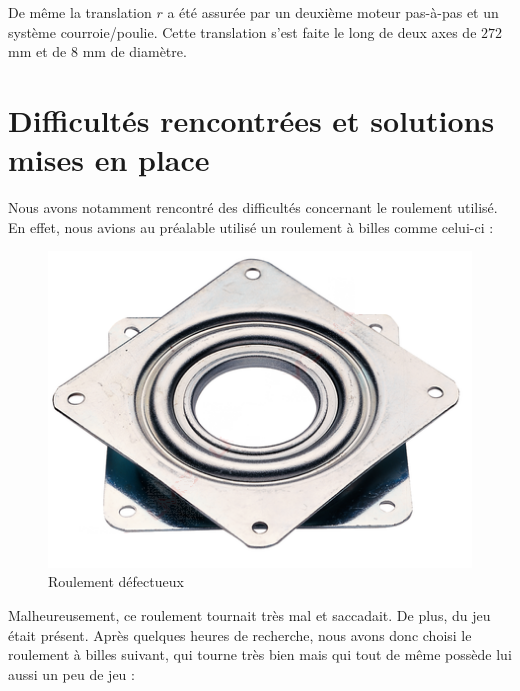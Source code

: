 \documentclass[12pt,a4paper]{report}
\begin{document}
De même la translation $r$ a été assurée par un deuxième moteur pas-à-pas et un système courroie/poulie. Cette translation s'est faite le long de deux axes de $272$ mm et de $8$ mm de diamètre.
	\section{Difficultés rencontrées et solutions mises en place}
	Nous avons notamment rencontré des difficultés concernant le roulement utilisé. En effet, nous avions au préalable utilisé un roulement à billes comme celui-ci :
	
	\begin{figure}[!h]
 \center
 \includegraphics[scale=0.5]{../pictures/roulementmerdique}
 \caption{Roulement défectueux}
\end{figure}

Malheureusement, ce roulement tournait très mal et saccadait. De plus, du jeu était présent. Après quelques heures de recherche, nous avons donc choisi le roulement à billes suivant, qui tourne très bien mais qui tout de même possède lui aussi un peu de jeu :
\end{document}
